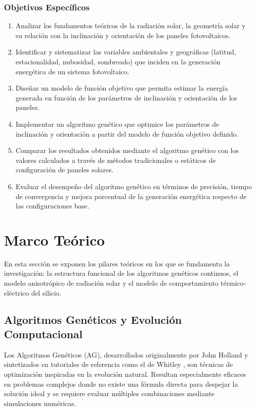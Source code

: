 \documentclass[12pt, a4paper, twocolumn]{article}
\begin{document}
\subsubsection{Objetivos Específicos}
\begin{enumerate}
    \item Analizar los fundamentos teóricos de la radiación solar, la geometría solar y su relación con la inclinación y orientación de los paneles fotovoltaicos.
    \item Identificar y sistematizar las variables ambientales y geográficas (latitud, estacionalidad, nubosidad, sombreado) que inciden en la generación energética de un sistema fotovoltaico.
    \item Diseñar un modelo de función objetivo que permita estimar la energía generada en función de los parámetros de inclinación y orientación de los paneles.
    \item Implementar un algoritmo genético que optimice los parámetros de inclinación y orientación a partir del modelo de función objetivo definido.
    \item Comparar los resultados obtenidos mediante el algoritmo genético con los valores calculados a través de métodos tradicionales o estáticos de configuración de paneles solares.
    \item Evaluar el desempeño del algoritmo genético en términos de precisión, tiempo de convergencia y mejora porcentual de la generación energética respecto de las configuraciones base.
\end{enumerate}

\section{Marco Teórico}
En esta sección se exponen los pilares teóricos en los que se fundamenta la investigación: la estructura funcional de los algoritmos genéticos continuos, el modelo anisotrópico de radiación solar y el modelo de comportamiento térmico-eléctrico del silicio.

\subsection{Algoritmos Genéticos y Evolución Computacional}
Los Algoritmos Genéticos (AG), desarrollados originalmente por John Holland y sintetizados en tutoriales de referencia como el de Whitley \cite{whitley1994tutorial}, son técnicas de optimización inspiradas en la evolución natural. Resultan especialmente eficaces en problemas complejos donde no existe una fórmula directa para despejar la solución ideal y se requiere evaluar múltiples combinaciones mediante simulaciones numéricas.
\end{document}
